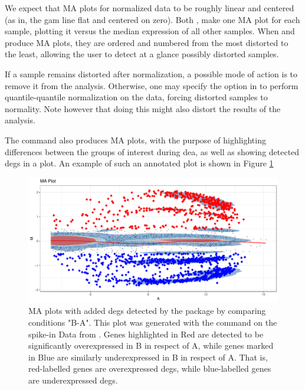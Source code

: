 We expect that MA plots for normalized data to be roughly linear and centered (as in, the \gls{gam} line flat and centered on zero). Both ,  make one MA plot for each sample, plotting it versus the median expression of all other samples. When  and  produce MA plots, they are ordered and numbered from the most distorted to the least, allowing the user to detect at a glance possibly distorted samples.

If a sample remains distorted after normalization, a possible mode of action is to remove it from the analysis. Otherwise, one may specify the  option in  to perform quantile-quantile normalization on the data, forcing distorted samples to normality. Note however that doing this might also distort the results of the analysis.

The  command also produces MA plots, with the purpose of highlighting differences between the groups of interest during \gls{dea}, as well as showing detected \glspl{deg} in a plot. An example of such an annotated plot is shown in Figure \ref{fig:PlatinumMAplotwithDEGs}

\begin{figure}
    \centering
    \includegraphics{resources/images/14_MA-Plot with Limma DEGs B-A.pdf}
    \caption{MA plots with added \glspl{deg} detected by the  package by comparing conditions "B-A". This plot was generated with the  command on the spike-in Data from \textcite{zhuPreferredAnalysisMethods2010}. Genes highlighted in Red are detected to be significantly overexpressed in B in respect of A, while genes marked in Blue are similarly underexpressed in B in respect of A. That is, red-labelled genes are overexpressed \glspl{deg}, while blue-labelled genes are underexpressed \glspl{deg}.}
    \label{fig:PlatinumMAplotwithDEGs}
\end{figure}

